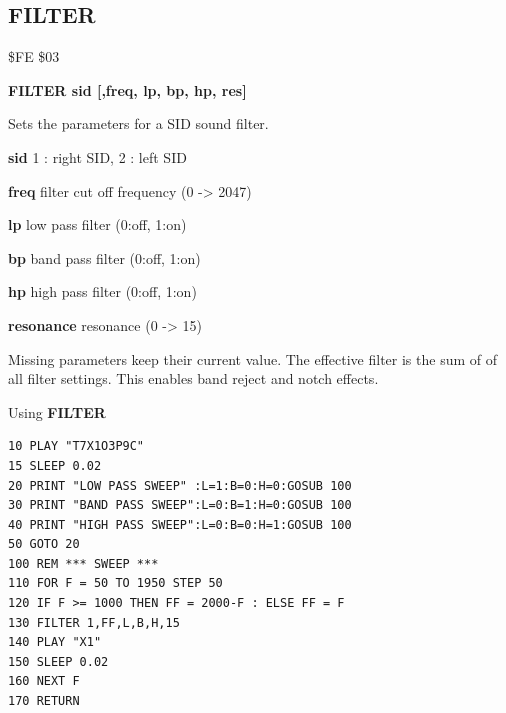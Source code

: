
\newpage
\subsection{FILTER}
\begin{description}[leftmargin=2cm,style=nextline]
\item [Token:] \$FE \$03
\item [Format:] {\bf FILTER sid [,freq, lp, bp, hp, res]}
\item [Usage:] Sets the parameters for a SID sound filter.

      {\bf sid} 1 : right SID, 2 : left SID

      {\bf freq} filter cut off frequency (0 -> 2047)

      {\bf lp} low pass filter (0:off, 1:on)

      {\bf bp} band pass filter (0:off, 1:on)

      {\bf hp} high pass filter (0:off, 1:on)

      {\bf resonance} resonance (0 -> 15)

\item [Remarks:] Missing parameters keep their current value.
                 The effective filter is the sum of
                 of all filter settings.
                 This enables band reject and notch effects.

\item [Example:]
                Using {\bf FILTER}
\begin{tcolorbox}[colback=black,coltext=white]
\verbatimfont{\codefont}
\begin{verbatim}
10 PLAY "T7X1O3P9C"
15 SLEEP 0.02
20 PRINT "LOW PASS SWEEP" :L=1:B=0:H=0:GOSUB 100
30 PRINT "BAND PASS SWEEP":L=0:B=1:H=0:GOSUB 100
40 PRINT "HIGH PASS SWEEP":L=0:B=0:H=1:GOSUB 100
50 GOTO 20
100 REM *** SWEEP ***
110 FOR F = 50 TO 1950 STEP 50
120 IF F >= 1000 THEN FF = 2000-F : ELSE FF = F
130 FILTER 1,FF,L,B,H,15
140 PLAY "X1"
150 SLEEP 0.02
160 NEXT F
170 RETURN
\end{verbatim}
\end{tcolorbox}
\end{description}


\newpage
